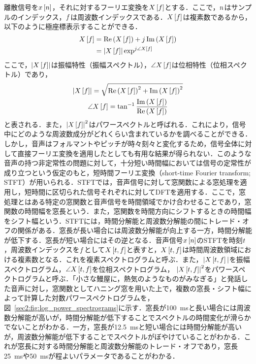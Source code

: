 離散信号を$x\left[n\right]$，それに対するフーリエ変換を$X\left[f\right]$とする．ここで，$n$はサンプルのインデックス，$f$は周波数インデックスである．$X\left[f\right]$は複素数であるから，以下のように極座標表示することができる．
\begin{align}
    X\left[f\right] & = \Re\left(X\left[f\right]\right) + j\Im\left(X\left[f\right]\right)    \\
                       & = \left|X\left[f\right]\right|\exp^{j\angle X\left[f\right]}
\end{align}
ここで，$\left|X\left[f\right]\right|$は振幅特性（振幅スペクトル），$\angle X\left[f\right]$は位相特性（位相スペクトル）であり，
\begin{gather}
    \left|X\left[f\right]\right| = \sqrt{\Re\left(X\left[f\right]\right)^{2} + \Im\left(X\left[f\right]\right)^{2}} \\
    \angle X\left[f\right] = \tan^{-1} \frac{\Im\left(X\left[f\right]\right)}{\Re\left(X\left[f\right]\right)}
\end{gather}
と表される．また，$\left|X\left[f\right]\right|^2$はパワースペクトルと呼ばれる．これにより，信号中にどのような周波数成分がどれくらい含まれているかを調べることができる．しかし，音声はフォルマントやピッチが時々刻々と変化するため，信号全体に対して直接フーリエ変換を適用したとしても有用な結果が得られない．このような音声の持つ非定常性の問題に対して，十分短い時間幅においては信号の定常性が成り立つという仮定のもと，短時間フーリエ変換（short-time Fourier transform; STFT）が用いられる．STFTでは，音声信号に対して窓関数による窓処理を適用し，短時間に区切られた信号それぞれに対してDFTを適用する．ここで，窓処理とはある特定の窓関数と音声信号を時間領域でかけ合わせることであり，窓関数の時間幅を窓長という．また，窓関数を時間方向にシフトするときの時間幅をシフト幅という．STFTには，時間分解能と周波数分解能の間にトレード・オフの関係がある．窓長が長い場合には周波数分解能が向上する一方，時間分解能が低下する．窓長が短い場合にはその逆となる．音声信号$x\left[n\right]$のSTFTを時刻$t$，周波数インデックスを$f$として$X\left[t, f\right]$と表すと，$X\left[t, f\right]$は時間周波数領域における複素数となる．これを複素スペクトログラムと呼ぶ．また，$|X\left[t, f\right]|$を振幅スペクトログラム，$\angle X\left[t, f\right]$を位相スペクトログラム，
$\left|X\left[t, f\right]\right|^{2}$をパワースペクトログラムと呼ぶ．「小さな鰻屋に，熱気のようなものがみなぎる」と発話した音声に対し，窓関数としてハニング窓を用いた上で，複数の窓長・シフト幅によって計算した対数パワースペクトログラムを，図~\ref{sec2:fig:log_power_spectrograms}に示す．窓長が\SI{100}{\ms}と長い場合には周波数分解能が高いが，時間分解能が低下することでスペクトルの時間変化が滑らかでないことがわかる．一方，窓長が\SI{12.5}{\ms}と短い場合には時間分解能が高いが，周波数分解能が低下することでスペクトルがぼやけていることがわかる．これが窓長に対する時間分解能と周波数分解能のトレード・オフであり，窓長\SI{25}{\ms}や\SI{50}{ms}が程よいパラメータであることがわかる．
